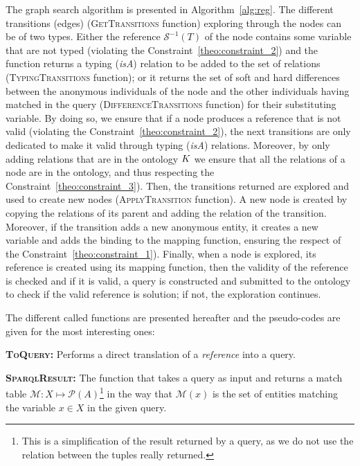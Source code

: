 \documentclass[a4paper,11pt,twoside]{StyleThese}
\begin{document}
The graph search algorithm is presented in Algorithm~\ref{alg:reg}. The different transitions (edges) (\textsc{GetTransitions} function) exploring through the nodes can be of two types. Either the reference $\mathcal{S}^{-1}(T)$ of the node contains some variable that are not typed (violating the Constraint~\ref{theo:constraint_2}) and the function returns a typing (\textit{isA}) relation to be added to the set of relations (\textsc{TypingTransitions} function); or it returns the set of soft and hard differences between the anonymous individuals of the node and the other individuals having matched in the \sparql{} query (\textsc{DifferenceTransitions} function) for their substituting variable. By doing so, we ensure that if a node produces a reference that is not valid (violating the Constraint~\ref{theo:constraint_2}), the next transitions are only dedicated to make it valid through typing (\textit{isA}) relations. Moreover, by only adding relations that are in the ontology $K$ we ensure that all the relations of a node are in the ontology, and thus respecting the Constraint~\ref{theo:constraint_3}). Then, the transitions returned are explored and used to create new nodes (\textsc{ApplyTransition} function). A new node is created by copying the relations of its parent and adding the relation of the transition. Moreover, if the transition adds a new anonymous entity, it creates a new variable and adds the binding to the mapping function, ensuring the respect of the Constraint~\ref{theo:constraint_1}). Finally, when a node is explored, its reference is created using its mapping function, then the validity of the reference is checked and if it is valid, a \sparql{} query is constructed and submitted to the ontology to check if the valid reference is solution; if not, the exploration continues.

The different called functions are presented hereafter and the pseudo-codes are given for the most interesting ones:

\textbf{\textsc{ToQuery}:}
Performs a direct translation of a \textit{reference} into a \sparql{} query.

\textbf{\textsc{SparqlResult}:}
The function that takes a \sparql{} query as input and returns a match table $\mathcal{M}: X \mapsto \mathcal{P}(A)$\footnote{This is a simplification of the result returned by a \sparql{} query, as we do not use the relation between the tuples really returned.} in the way that $\mathcal{M}(x)$ is the set of entities matching the variable $x \in X$ in the given query.
\end{document}
